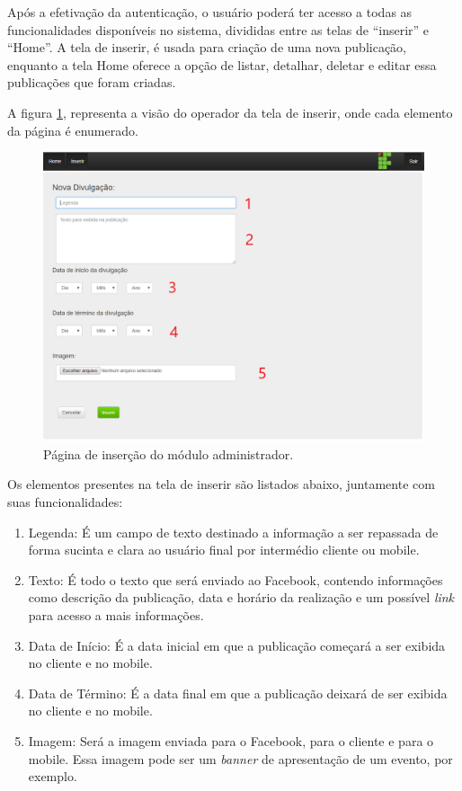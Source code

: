 Após a efetivação da autenticação, o usuário poderá ter acesso a todas as funcionalidades disponíveis no sistema, divididas entre as telas de ``inserir'' e ``Home''. A tela de inserir, é usada para criação de uma nova publicação, enquanto a tela Home oferece a opção de listar, detalhar, deletar e editar essa publicações que foram criadas.

A figura \ref{fig:administrador1}, representa a visão do operador da tela de inserir, onde cada elemento da página é enumerado.

\begin{figure}[H]
\centering
\includegraphics[scale=0.5]{figuras/administrador1}
\caption{Página de inserção do módulo administrador.}
\label{fig:administrador1}
\end{figure}

Os elementos presentes na tela de inserir são listados abaixo, juntamente com suas funcionalidades: 

\begin{enumerate}
   \item Legenda: É um campo de texto destinado a informação a ser repassada de forma sucinta e clara ao usuário final por intermédio cliente ou mobile. 
   \item Texto: É todo o texto que será enviado ao Facebook, contendo informações como descrição da publicação, data e horário da realização e um possível \textit{link} para acesso a mais informações. 
   \item Data de Início: É a data inicial em que a publicação começará a ser exibida no cliente e no mobile.
   \item Data de Término: É a data final em que a publicação deixará de ser exibida no cliente e no mobile.
   \item Imagem: Será a imagem enviada para o Facebook, para o cliente e para o mobile. Essa imagem pode ser um \textit{banner} de apresentação de um evento, por exemplo.
 \end{enumerate}


